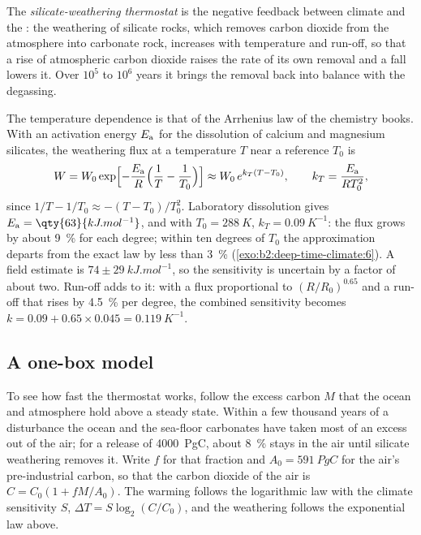 \begin{definition}\label{def:b2:deep-time-climate:thermostat}
The \emph{silicate-weathering thermostat} is the negative
feedback between climate and the : the weathering of silicate rocks, which
removes carbon dioxide from the atmosphere into carbonate rock, increases with temperature and
run-off, so that a rise of atmospheric carbon dioxide raises the rate of its own removal and a
fall lowers it. Over $10^5$ to $10^6$ years it brings the removal back into balance with the
degassing.
\end{definition}

The temperature dependence is that of the Arrhenius law of the chemistry books. With an activation
energy $E_{\text a}$ for the dissolution of calcium and magnesium silicates, the weathering flux at
a temperature $T$ near a reference $T_0$ is
\[
  W = W_0 \exp\Bigl[-\frac{E_{\text a}}{R}\Bigl(\frac1T - \frac1{T_0}\Bigr)\Bigr]
  \approx W_0\, e^{k_T (T - T_0)}, \qquad k_T = \frac{E_{\text a}}{R T_0^2},
\]
since $1/T - 1/T_0 \approx -(T - T_0)/T_0^2$. Laboratory dissolution gives $E_{\text a} =
\qty{63}{kJ.mol^{-1}}$, and with $T_0 = \qty{288}{K}$, $k_T = \qty{0.09}{K^{-1}}$: the flux grows
by about \qty{9}{\percent} for each degree; within ten degrees of $T_0$ the approximation departs
from the exact law by less than \qty{3}{\percent} (\cref{exo:b2:deep-time-climate:6}). A field estimate is
$74 \pm \qty{29}{kJ.mol^{-1}}$, so the sensitivity is uncertain by a factor of about two. Run-off
adds to it: with a flux proportional to $(R/R_0)^{0.65}$ and a run-off that rises by
\qty{4.5}{\percent} per degree, the combined sensitivity becomes $k = 0.09 + 0.65\times0.045 =
\qty{0.119}{K^{-1}}$.

\subsection*{A one-box model}

To see how fast the thermostat works, follow the excess carbon $M$ that the ocean and atmosphere
hold above a steady state. Within a few thousand years of a disturbance the ocean and the sea-floor
carbonates have taken most of an excess out of the air; for a release of \qty{4000}{PgC}, about
\qty{8}{\percent} stays in the air until silicate weathering removes it. Write $f$ for that
fraction and $A_0 = \qty{591}{PgC}$ for the air's pre-industrial carbon, so that the carbon dioxide
of the air is $C = C_0(1 + fM/A_0)$. The warming follows the logarithmic law with the climate
sensitivity $S$, $\Delta T = S\log_2(C/C_0)$, and the weathering follows the exponential law above.

